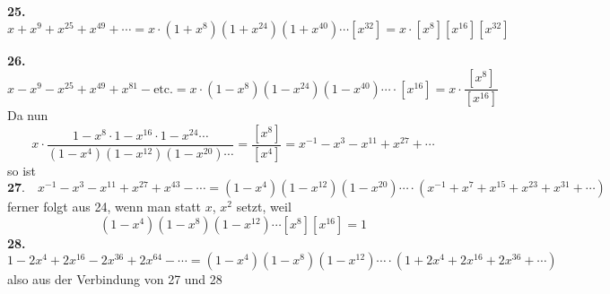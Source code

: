 \documentclass[10pt,a4paper]{article}
\begin{document}
\textbf{25.}
\begin{equation*}
x + x^9 + x^{25} + x^{49} + \cdots = x \cdot (1 + x^8)(1 + x^{24})(1 + x^{40}) \cdots [x^{32}] = x \cdot [x^8][x^{16}][x^{32}]
\end{equation*}

\textbf{26.}
\begin{equation*}
x - x^9 - x^{25} + x^{49} + x^{81} - \text{etc.} = x \cdot (1 - x^8)(1 - x^{24})(1 - x^{40}) \cdots \cdot [x^{16}] = x \cdot \frac{[x^8]}{[x^{16}]}
\end{equation*}
%
Da nun
%
\begin{equation*}
x \cdot \frac{1 - x^8 \cdot 1 - x^{16} \cdot 1 - x^{24} \cdots}{(1 - x^4)(1 - x^{12})(1 - x^{20}) \cdots} = \frac{[x^8]}{[x^4]} = x^{-1} - x^3 - x^{11} + x^{27} + \cdots
\end{equation*}
%
so ist
%
\begin{equation*}
\textbf{27.} \quad x^{-1} - x^3 - x^{11} + x^{27} + x^{43} - \cdots =
(1 - x^4)(1 - x^{12})(1 - x^{20}) \cdots \cdot (x^{-1} + x^7 + x^{15} + x^{23} + x^{31} + \cdots)
\end{equation*}
%
ferner folgt aus 24, wenn man statt $x$, $x^2$ setzt, weil
%
\begin{equation*}
(1 - x^4)(1 - x^8)(1 - x^{12}) \cdots [x^8][x^{16}] = 1
\end{equation*}
%
\textbf{28.}
\begin{equation*}
1 - 2x^4 + 2x^{16} - 2x^{36} + 2x^{64} - \cdots =
(1 - x^4)(1 - x^8)(1 - x^{12}) \cdots \cdot (1 + 2x^4 + 2x^{16} + 2x^{36} + \cdots)
\end{equation*}
%
also aus der Verbindung von 27 und 28

\newpage
\end{document}
